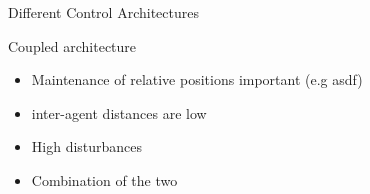 \begin{frame}{Different Control Architectures}
\begin{minipage}{0.45\textwidth}
\begin{figure}
		\end{figure}
		Coupled architecture
		\begin{itemize}
			\item Maintenance of relative positions important (e.g asdf) 
			\item inter-agent distances are low
			\item High disturbances
		\end{itemize}
	\end{minipage} 
	\begin{itemize}
		\item Combination of the two		
	\end{itemize}
\end{frame}